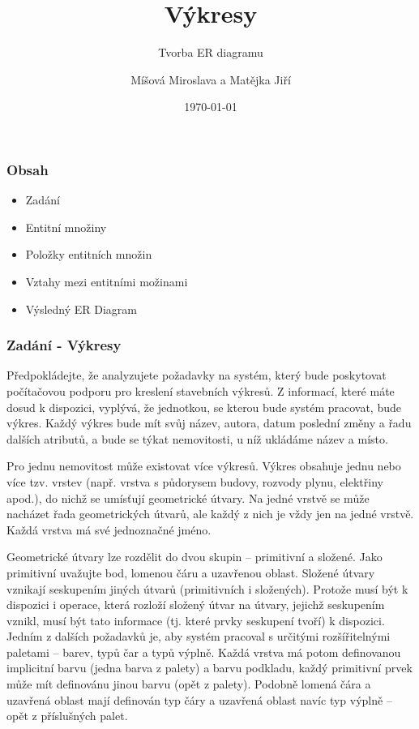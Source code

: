 \documentclass{beamer}
\title{Výkresy}
\subtitle{Tvorba ER diagramu}
\author{Míšová Miroslava a Matějka Jiří}
\date{\today}
\begin{document}
  \frame{\titlepage}
  \begin{frame}
    \frametitle{Obsah}
    
    \begin{itemize}
      \item Zadání
      \item Entitní množiny
      \item Položky entitních množin
      \item Vztahy mezi entitními možinami
      \item Výsledný ER Diagram
    \end{itemize}
  \end{frame}
  \begin{frame}
    \frametitle{Zadání - Výkresy}
    \hspace{2mm}
      \scriptsize{
      Předpokládejte, že analyzujete požadavky na systém, který bude poskytovat počítačovou 
      podporu pro kreslení stavebních výkresů. Z informací, které máte dosud k dispozici,
      vyplývá, že jednotkou, se kterou bude systém pracovat, bude výkres. Každý výkres bude
      mít svůj název, autora, datum poslední změny a řadu dalších atributů, a bude se týkat
      nemovitosti, u níž ukládáme název a místo.\par


      \hspace{0.5cm}Pro jednu nemovitost může existovat více výkresů. Výkres obsahuje jednu nebo více tzv.
      vrstev (např. vrstva s půdorysem budovy, rozvody plynu, elektřiny apod.), do nichž se
      umísťují geometrické útvary. Na jedné vrstvě se může nacházet řada geometrických útvarů,
      ale každý z nich je vždy jen na jedné vrstvě. Každá vrstva má své jednoznačné jméno.\par

  
      \hspace{0.5cm}Geometrické útvary lze rozdělit do dvou skupin -- primitivní a složené. Jako primitivní
      uvažujte bod, lomenou čáru a uzavřenou oblast. Složené útvary vznikají seskupením jiných
      útvarů (primitivních i složených). Protože musí být k dispozici i operace, která rozloží
      složený útvar na útvary, jejichž seskupením vznikl, musí být tato informace (tj. které
      prvky seskupení tvoří) k dispozici. Jedním z dalších požadavků je, aby systém pracoval
      s určitými rozšířitelnými paletami -- barev, typů čar a typů výplně. Každá vrstva má
      potom definovanou implicitní barvu (jedna barva  z  palety) a barvu podkladu, každý
      primitivní prvek může mít definovánu jinou barvu (opět z palety). Podobně lomená čára
      a uzavřená oblast mají definován typ čáry a uzavřená oblast navíc typ výplně – opět
      z příslušných palet.\par}

  \end{frame}
\end{document}
